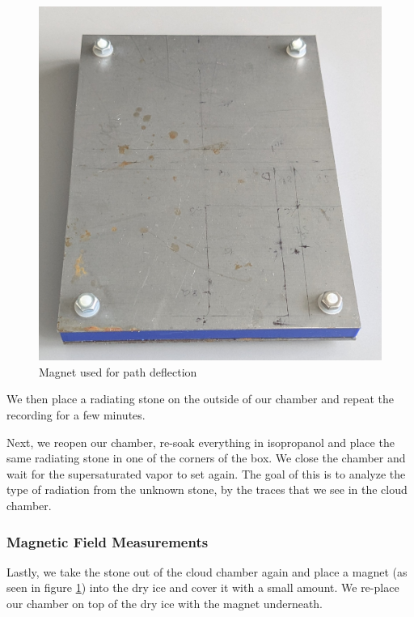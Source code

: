 \documentclass[10pt,a4paper]{article}
\begin{document}
\begin{figure}
    \vspace{-\baselineskip}
    \includegraphics[width=1\linewidth]{images/magnet photo.jpg}
    \caption{Magnet used for path deflection}
    \label{fig:magnet-photo}
\end{figure}

We then place a radiating stone on the outside of our chamber and repeat the recording for a few minutes.

Next, we reopen our chamber, re-soak everything in isopropanol and place the same radiating stone in one of the corners of the box. We close the chamber and wait for the supersaturated vapor to set again. The goal of this is to analyze the type of radiation from the unknown stone, by the traces that we see in the cloud chamber.

\subsubsection{Magnetic Field Measurements}

Lastly, we take the stone out of the cloud chamber again and place a magnet (as seen in figure \ref{fig:magnet-photo}) into the dry ice and cover it with a small amount. We re-place our chamber on top of the dry ice with the magnet underneath.
\end{document}
